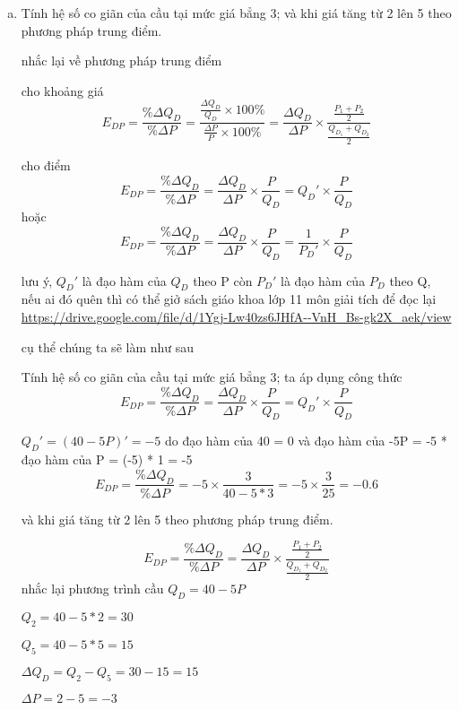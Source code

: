 \begin{enumerate}[a.]
  \item  Tính hệ số co giãn của cầu tại mức giá bẳng 3; và khi giá tăng từ 2 lên 5 theo phương
        pháp trung điểm.

        nhắc lại về phương pháp trung điểm

        cho khoảng giá
        \[ E_{DP} = \frac{\%\Delta Q_D}{\%\Delta P} =
          \frac{\frac{\Delta Q_D}{Q_D} \times 100 \% }{ \frac{\Delta P}{P} \times 100 \%  } =
          \frac{\Delta Q_D}{\Delta P}  \times
          \frac{\frac{P_1 + P_2}{2}}{\frac{Q_{D_1} + Q_{D_2}}{2}} \]

        cho điểm
        \[ E_{DP} = \frac{\%\Delta Q_D}{\%\Delta P} =
          \frac{\Delta Q_D}{\Delta P} \times \frac{P}{Q_D} = Q_D' \times \frac{P}{Q_D} \]
        hoặc
        \[ E_{DP} = \frac{\%\Delta Q_D}{\%\Delta P} =
          \frac{\Delta Q_D}{\Delta P} \times \frac{P}{Q_D} = \frac{1}{P_D'} \times \frac{P}{Q_D} \]

        lưu ý, $Q_D'$ là đạo hàm của $Q_D$ theo P còn $P_D'$ là đạo hàm của $P_D$ theo Q, nếu ai đó quên thì có thể giở sách giáo khoa lớp 11 môn giải tích để đọc lại \url{https://drive.google.com/file/d/1Ygj-Lw40zs6JHfA--VnH\_Bs-gk2X\_aek/view}

        cụ thể chúng ta sẽ làm như sau

        Tính hệ số co giãn của cầu tại mức giá bẳng 3;
        ta áp dụng công thức
        \[ E_{DP} = \frac{\%\Delta Q_D}{\%\Delta P} =
          \frac{\Delta Q_D}{\Delta P} \times \frac{P}{Q_D} = Q_D' \times \frac{P}{Q_D} \]

        $Q_D' = ( 40 - 5P)' = -5$
        do đạo hàm của 40 = 0 và đạo hàm của -5P = -5 * đạo hàm của P = (-5) * 1 = -5
        \[ E_{DP} = \frac{\%\Delta Q_D}{\%\Delta P} = -5 \times \frac{3}{40 - 5 * 3}
          = -5 \times \frac{3}{25} = -0.6 \]

        và khi giá tăng từ 2 lên 5 theo phương  pháp trung điểm.

        \[ E_{DP} = \frac{\%\Delta Q_D}{\%\Delta P} =
          \frac{\Delta Q_D}{\Delta P}  \times
          \frac{\frac{P_1 + P_2}{2}}{\frac{Q_{D_1} + Q_{D_2}}{2}}
        \]
        nhắc lại phương trình cầu $Q_D = 40 - 5P$

        $Q_2 = 40 - 5 * 2 = 30$

        $Q_5 = 40 - 5 * 5 = 15$

        $\Delta Q_D = Q_2 - Q_5 = 30 - 15 = 15$

        $\Delta P = 2 - 5 = -3$


\end{enumerate}
